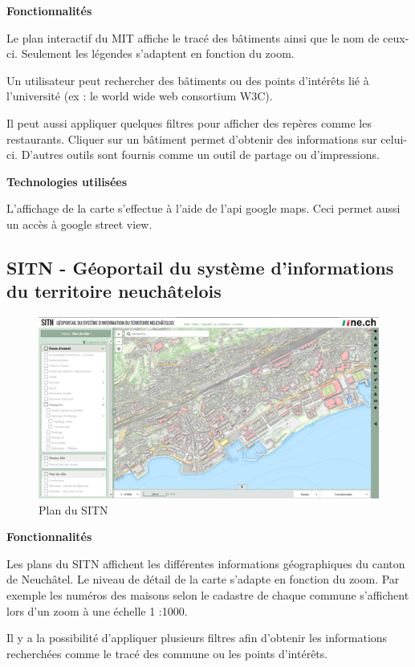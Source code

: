 \documentclass[
    iai, %
    il, %
]{heig-tb}
\begin{document}
\textbf{Fonctionnalités}

Le plan interactif du MIT \cite{mit-map} affiche le tracé des bâtiments ainsi que le nom de ceux-ci. Seulement les légendes s'adaptent en fonction du zoom.

Un utilisateur peut rechercher des bâtiments ou des points d'intérêts lié à l'université (ex : le world wide web consortium W3C).

Il peut aussi appliquer quelques filtres pour afficher des repères comme les restaurants. Cliquer sur un bâtiment permet d'obtenir des informations sur celui-ci. D'autres outils sont fournis comme un outil de partage ou d'impressions.

\textbf{Technologies utilisées}

L'affichage de la carte s'effectue à l'aide de l'api google maps. Ceci permet aussi un accès à google street view.

\subsection{SITN - Géoportail du système d'informations du territoire neuchâtelois}

\begin{figure}[H]
    \caption{Plan du SITN}
    \centering
    \includegraphics{planSITN.png}
\end{figure}

\textbf{Fonctionnalités}

Les plans du SITN \cite{sitn} affichent les différentes informations géographiques du canton de Neuchâtel.
Le niveau de détail de la carte s'adapte en fonction du zoom.
Par exemple les numéros des maisons selon le cadastre de chaque commune s'affichent lors d'un zoom à une échelle 1 :1000.

Il y a la possibilité d'appliquer plusieurs filtres afin d'obtenir les informations recherchées comme le tracé des commune ou les points d'intérêts.
\end{document}
